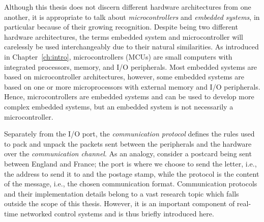 Although this thesis does not discern different hardware architectures from one another, it is appropriate to talk about \emph{microcontrollers} and \emph{embedded systems}, in particular because of their growing recognition. 
Despite being two different hardware architectures, the terms embedded system and microcontroller will carelessly be used interchangeably due to their natural similarities.
As introduced in Chapter~\ref{ch:intro}, microcontrollers (MCUs) are small computers with integrated processors, memory, and I/O peripherals.
Most embedded systems are based on microcontroller architectures, however, some embedded systems are based on one or more microprocessors with external memory and I/O peripherals.
Hence, microcontrollers are embedded systems and can be used to develop more complex embedded systems, but an embedded system is not necessarily a microcontroller.


Separately from the I/O port, the \emph{communication protocol} defines the rules used to pack and unpack the packets sent between the peripherals and the hardware over the \emph{communication channel}.
As an analogy, consider a postcard being sent between England and France; the port is where we choose to send the letter, i.e., the address to send it to and the postage stamp, while the protocol is the content of the message, i.e., the chosen communication format.
Communication protocols and their implementation details belong to a vast research topic which falls outside the scope of this thesis.
However, it is an important component of real-time networked control systems and is thus briefly introduced here.

